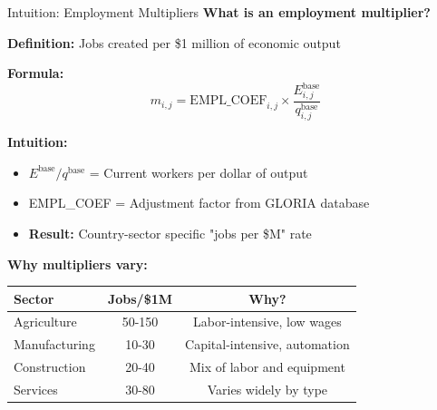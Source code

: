 \documentclass[10pt]{beamer}
\begin{document}
\begin{frame}{Intuition: Employment Multipliers}
\textbf{What is an employment multiplier?}

\vspace{0.3cm}

\textbf{Definition:} Jobs created per \$1 million of economic output

\vspace{0.3cm}

\textbf{Formula:}
\[
m_{i,j} = \text{EMPL\_COEF}_{i,j} \times \frac{E^{\text{base}}_{i,j}}{q^{\text{base}}_{i,j}}
\]

\vspace{0.3cm}

\textbf{Intuition:}
\begin{itemize}
    \item $E^{\text{base}} / q^{\text{base}}$ = Current workers per dollar of output
    \item EMPL\_COEF = Adjustment factor from GLORIA database
    \item \textbf{Result:} Country-sector specific "jobs per \$M" rate
\end{itemize}

\vspace{0.3cm}

\textbf{Why multipliers vary:}

\vspace{0.2cm}

\begin{table}[h]
\centering
\small
\begin{tabular}{lcc}
\toprule
\textbf{Sector} & \textbf{Jobs/\$1M} & \textbf{Why?} \\
\midrule
Agriculture & 50-150 & Labor-intensive, low wages \\
Manufacturing & 10-30 & Capital-intensive, automation \\
Construction & 20-40 & Mix of labor and equipment \\
Services & 30-80 & Varies widely by type \\
\bottomrule
\end{tabular}
\end{table}

\end{frame}

\end{document}
